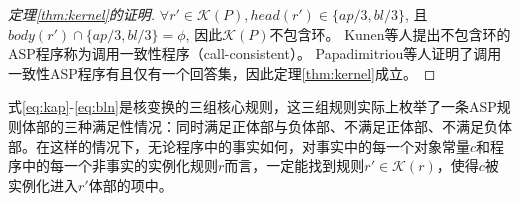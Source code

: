    \begin{proof}[定理\ref{thm:kernel}的证明]
        $\forall r' \in \mathcal{K}(P), head(r') \in \{ap/3, bl/3\}$, 且 $body(r') \cap \{ap/3, bl/3\} = \phi$, 因此$\mathcal{K}(P)$不包含环。 Kunen等人提出不包含环的ASP程序称为调用一致性程序（call-consistent）\cite{kunen1989signed}。 Papadimitriou等人证明了调用一致性ASP程序有且仅有一个回答集\cite{PAPADIMITRIOU199748}，因此定理\ref{thm:kernel}成立。
    \end{proof}

    式\eqref{eq:kap}-\eqref{eq:bln}是核变换的三组核心规则，这三组规则实际上枚举了一条ASP规则体部的三种满足性情况：同时满足正体部与负体部、不满足正体部、不满足负体部。在这样的情况下，无论程序中的事实如何，对事实中的每一个对象常量$c$和程序中的每一个非事实的实例化规则$r$而言，一定能找到规则$r' \in \mathcal{K}(r)$，使得$c$被实例化进入$r'$体部的项中。

